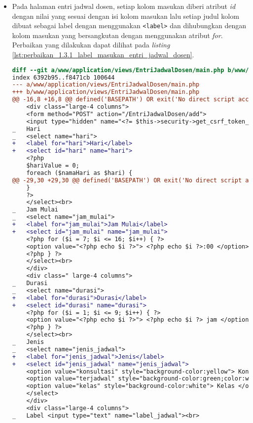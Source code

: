 \begin{itemize}
\item Pada halaman entri jadwal dosen, setiap kolom masukan diberi atribut \textit{id} dengan nilai yang sesuai dengan isi kolom masukan lalu setiap judul kolom dibuat sebagai label dengan menggunakan \texttt{<label>} dan dihubungkan dengan kolom masukan yang bersangkutan dengan menggunakan atribut \textit{for}. Perbaikan yang dilakukan dapat dilihat pada \textit{listing} \ref{lst:perbaikan_1.3.1_label_masukan_entri_jadwal_dosen}.
\begin{lstlisting}[frame=single, label={lst:perbaikan_1.3.1_label_masukan_entri_jadwal_dosen}, language=diff, caption=Perbaikan Kriteria Sukses 1.3.1 pada Kolom Masukan di Halaman Entri Jadwal Dosen]
diff --git a/www/application/views/EntriJadwalDosen/main.php b/www/application/views/EntriJadwalDosen/main.php
index 6392b95..f8471cb 100644
--- a/www/application/views/EntriJadwalDosen/main.php
+++ b/www/application/views/EntriJadwalDosen/main.php
@@ -16,8 +16,8 @@ defined('BASEPATH') OR exit('No direct script access allowed');
    <div class="large-4 columns">
    <form method="POST" action="/EntriJadwalDosen/add">
    <input type="hidden" name="<?= $this->security->get_csrf_token_name() ?>" value="<?= $this->security->get_csrf_hash() ?>" />
_   Hari
_   <select name="hari"> 
+   <label for="hari">Hari</label>
+   <select id="hari" name="hari">
    <?php
    $hariValue = 0;
    foreach ($namaHari as $hari) {
@@ -29,30 +29,30 @@ defined('BASEPATH') OR exit('No direct script access allowed');
    }
    ?>
    </select><br>
_   Jam Mulai
_   <select name="jam_mulai"> 
+   <label for="jam_mulai">Jam Mulai</label>
+   <select id="jam_mulai" name="jam_mulai"> 
    <?php for ($i = 7; $i <= 16; $i++) { ?>
    <option value="<?php echo $i ?>"> <?php echo $i ?>:00 </option>
    <?php } ?>
    </select><br>
    </div>
    <div class=" large-4 columns">
_   Durasi
_   <select name="durasi"> 
+   <label for="durasi">Durasi</label>
+   <select id="durasi" name="durasi"> 
    <?php for ($i = 1; $i <= 9; $i++) { ?>
    <option value="<?php echo $i ?>"> <?php echo $i ?> jam </option>
    <?php } ?>
    </select><br>
_   Jenis  
_   <select name="jenis_jadwal"> 
+   <label for="jenis_jadwal">Jenis</label>
+   <select id="jenis_jadwal" name="jenis_jadwal"> 
    <option value="konsultasi" style="background-color:yellow"> Konsultasi </option>
    <option value="terjadwal" style="background-color:green;color:white"> Terjadwal</option>
    <option value="kelas" style="background-color:white"> Kelas </option>
    </select>
    </div>
    <div class="large-4 columns">
_   Label <input type="text" name="label_jadwal"><br>

\end{lstlisting}
\end{itemize}
